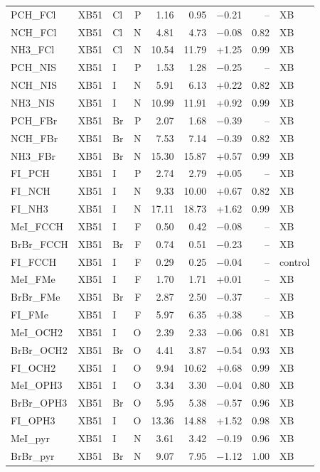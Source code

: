 {\begin{longtable}{lllrrrrrl}
PCH\_FCl & XB51 & Cl & P & 1.16 & 0.95 & $-$0.21 & -- & XB\\
NCH\_FCl & XB51 & Cl & N & 4.81 & 4.73 & $-$0.08 & 0.82 & XB\\
NH3\_FCl & XB51 & Cl & N & 10.54 & 11.79 & +1.25 & 0.99 & XB\\
PCH\_NIS & XB51 & I & P & 1.53 & 1.28 & $-$0.25 & -- & XB\\
NCH\_NIS & XB51 & I & N & 5.91 & 6.13 & +0.22 & 0.82 & XB\\
NH3\_NIS & XB51 & I & N & 10.99 & 11.91 & +0.92 & 0.99 & XB\\
PCH\_FBr & XB51 & Br & P & 2.07 & 1.68 & $-$0.39 & -- & XB\\
NCH\_FBr & XB51 & Br & N & 7.53 & 7.14 & $-$0.39 & 0.82 & XB\\
NH3\_FBr & XB51 & Br & N & 15.30 & 15.87 & +0.57 & 0.99 & XB\\
FI\_PCH & XB51 & I & P & 2.74 & 2.79 & +0.05 & -- & XB\\
FI\_NCH & XB51 & I & N & 9.33 & 10.00 & +0.67 & 0.82 & XB\\
FI\_NH3 & XB51 & I & N & 17.11 & 18.73 & +1.62 & 0.99 & XB\\
MeI\_FCCH & XB51 & I & F & 0.50 & 0.42 & $-$0.08 & -- & XB\\
BrBr\_FCCH & XB51 & Br & F & 0.74 & 0.51 & $-$0.23 & -- & XB\\
FI\_FCCH & XB51 & I & F & 0.29 & 0.25 & $-$0.04 & -- & control\\
MeI\_FMe & XB51 & I & F & 1.70 & 1.71 & +0.01 & -- & XB\\
BrBr\_FMe & XB51 & Br & F & 2.87 & 2.50 & $-$0.37 & -- & XB\\
FI\_FMe & XB51 & I & F & 5.97 & 6.35 & +0.38 & -- & XB\\
MeI\_OCH2 & XB51 & I & O & 2.39 & 2.33 & $-$0.06 & 0.81 & XB\\
BrBr\_OCH2 & XB51 & Br & O & 4.41 & 3.87 & $-$0.54 & 0.93 & XB\\
FI\_OCH2 & XB51 & I & O & 9.94 & 10.62 & +0.68 & 0.99 & XB\\
MeI\_OPH3 & XB51 & I & O & 3.34 & 3.30 & $-$0.04 & 0.80 & XB\\
BrBr\_OPH3 & XB51 & Br & O & 5.95 & 5.38 & $-$0.57 & 0.96 & XB\\
FI\_OPH3 & XB51 & I & O & 13.36 & 14.88 & +1.52 & 0.98 & XB\\
MeI\_pyr & XB51 & I & N & 3.61 & 3.42 & $-$0.19 & 0.96 & XB\\
BrBr\_pyr & XB51 & Br & N & 9.07 & 7.95 & $-$1.12 & 1.00 & XB\\

\end{longtable}}
